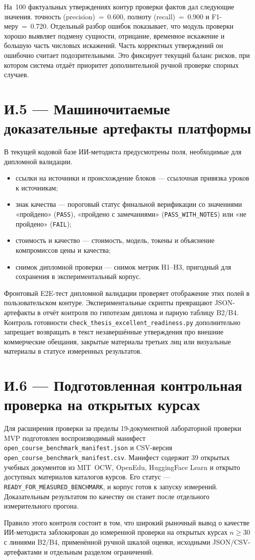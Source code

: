 На~100 фактуальных утверждениях контур проверки фактов дал следующие значения.
точность (precision)~=~0.600, полноту (recall)~=~0.900 и F1-меру~=~0.720.
Отдельный разбор ошибок показывает, что модуль проверки хорошо выявляет
подмену сущности, отрицание, временное искажение и большую часть числовых
искажений. Часть корректных утверждений он ошибочно считает
подозрительными. Это фиксирует текущий баланс рисков, при котором система отдаёт
приоритет дополнительной ручной проверке спорных случаев.

\section*{И.5 — Машиночитаемые доказательные артефакты платформы}

В текущей кодовой базе ИИ-методиста предусмотрены поля, необходимые
для дипломной валидации.
\begin{itemize}
  \item ссылки на источники и происхождение блоков — ссылочная
    привязка уроков к источникам;
  \item знак качества — пороговый статус финальной верификации со значениями
    «пройдено» (\texttt{PASS}),
    «пройдено с замечаниями» (\texttt{PASS\_WITH\_NOTES}) или
    «не пройдено» (\texttt{FAIL});
  \item стоимость и качество — стоимость, модель, токены и
    объяснение компромиссов цены и качества;
  \item снимок дипломной проверки — снимок метрик H1–H3,
    пригодный для сохранения в экспериментальный корпус.
\end{itemize}

Фронтовый E2E-тест дипломной валидации проверяет отображение этих
полей в пользовательском контуре. Экспериментальные скрипты
превращают JSON-артефакты в отчёт контроля по гипотезам диплома
и парную таблицу B2/B4. Контроль готовности
\texttt{check\_thesis\_excellent\_readiness.py}
дополнительно запрещает возвращать в текст незавершённые утверждения
про внешние коммерческие обещания, закрытые материалы третьих лиц или
визуальные материалы в статусе измеренных результатов.

\section*{И.6 — Подготовленная контрольная проверка на открытых курсах}

Для расширения проверки за пределы 19-документной лабораторной проверки MVP
подготовлен воспроизводимый манифест \texttt{open\_course\_benchmark\_manifest.json}
и CSV-версия \texttt{open\_course\_benchmark\_manifest.csv}. Манифест
содержит 39 открытых учебных документов из MIT~OCW, OpenEdu,
HuggingFace Learn и открыто доступных материалов каталогов курсов.
Его статус — \texttt{READY\_FOR\_MEASURED\_BENCHMARK}, и корпус
готов к запуску измерений. Доказательным результатом по качеству он станет
после отдельного измерительного прогона.

Правило этого контроля состоит в том, что широкий рыночный вывод о качестве ИИ-методиста
заблокирован до измеренной проверки на открытых курсах $n \geq 30$
с линиями B2/B4, применённой ручной шкалой оценки, исходными
JSON/CSV-артефактами и отдельным разделом ограничений.
